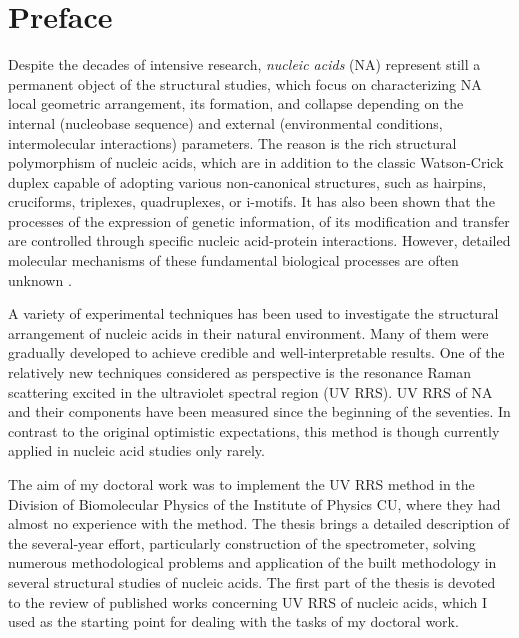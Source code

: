 \chapter*{Preface}

Despite the decades of intensive research, \emph{nucleic acids} (NA) represent
still a permanent object of the structural studies, which focus on
characterizing NA local geometric arrangement, its formation, and collapse
depending on the internal (nucleobase sequence) and external (environmental
conditions, intermolecular interactions) parameters.
The reason is the rich structural polymorphism of nucleic acids, which are in
addition to the classic Watson-Crick duplex capable of adopting various
non-canonical structures, such as hairpins, cruciforms, triplexes,
quadruplexes, or i-motifs.
It has also been shown that the processes of the expression of genetic
information, of its modification and transfer are controlled through specific
nucleic acid-protein interactions.
However, detailed molecular mechanisms of these fundamental biological
processes are often unknown
\parencite{%
	Bansal2014,%
	Kaushik2016,%
	Yamamoto2021%
}.

A variety of experimental techniques has been used to investigate the
structural arrangement of nucleic acids in their natural environment.
Many of them were gradually developed to achieve credible and
well-interpretable results.
One of the relatively new techniques considered as perspective is the
resonance Raman scattering excited in the ultraviolet spectral region (UV RRS).
UV RRS of NA and their components have been measured since the beginning of
the seventies.
In contrast to the original optimistic expectations, this method is though
currently applied in nucleic acid studies only rarely.

The aim of my doctoral work was to implement the UV RRS method in the Division
of Biomolecular Physics of the Institute of Physics CU, where they had almost
no experience with the method.
The thesis brings a detailed description of the several-year effort,
particularly construction of the spectrometer, solving numerous methodological
problems and application of the built methodology in several structural studies
of nucleic acids.
The first part of the thesis is devoted to the review of published works
concerning UV RRS of nucleic acids, which I used as the starting point for
dealing with the tasks of my doctoral work.
